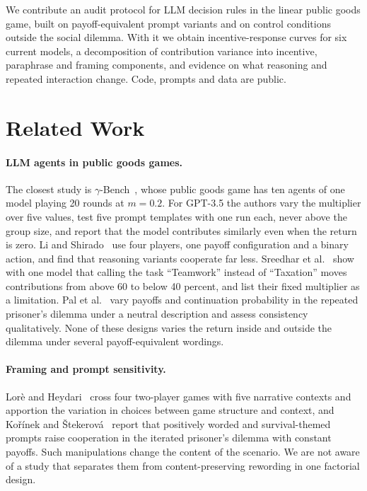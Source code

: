 \documentclass[runningheads]{llncs}
\begin{document}
We contribute an audit protocol for LLM decision rules in the linear public goods game, built on payoff-equivalent prompt variants and on control conditions outside the social dilemma. With it we obtain incentive-response curves for six current models, a decomposition of contribution variance into incentive, paraphrase and framing components, and evidence on what reasoning and repeated interaction change. Code, prompts and data are public.

\section{Related Work}

\paragraph{LLM agents in public goods games.}
The closest study is $\gamma$-Bench~\cite{huang2025gama}, whose public goods game has ten agents of one model playing 20 rounds at $m=0.2$. For GPT-3.5 the authors vary the multiplier over five values, test five prompt templates with one run each, never above the group size, and report that the model contributes similarly even when the return is zero. Li and Shirado~\cite{li2025spontaneous} use four players, one payoff configuration and a binary action, and find that reasoning variants cooperate far less. Sreedhar et al.~\cite{sreedhar2025simulating} show with one model that calling the task ``Teamwork'' instead of ``Taxation'' moves contributions from above 60 to below 40 percent, and list their fixed multiplier as a limitation. Pal et al.~\cite{pal2026llm} vary payoffs and continuation probability in the repeated prisoner's dilemma under a neutral description and assess consistency qualitatively. None of these designs varies the return inside and outside the dilemma under several payoff-equivalent wordings.

\paragraph{Framing and prompt sensitivity.}
Lor\`e and Heydari~\cite{lore2024strategic} cross four two-player games with five narrative contexts and apportion the variation in choices between game structure and context, and Ko\v{r}\'inek and \v{S}tekerov\'a~\cite{korinek2026words} report that positively worded and survival-themed prompts raise cooperation in the iterated prisoner's dilemma with constant payoffs. Such manipulations change the content of the scenario. We are not aware of a study that separates them from content-preserving rewording in one factorial design.
\end{document}
